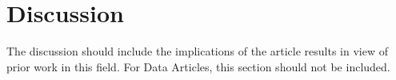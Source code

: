 \section*{Discussion}
The discussion should include the implications of the article results in view of prior work in this field.
For Data Articles, this section should not be included. 

